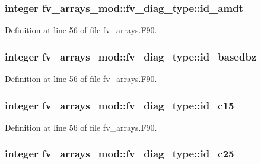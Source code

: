 \subsubsection[{id\-\_\-amdt}]{\setlength{\rightskip}{0pt plus 5cm}integer fv\-\_\-arrays\-\_\-mod\-::fv\-\_\-diag\-\_\-type\-::id\-\_\-amdt}\label{structfv__arrays__mod_1_1fv__diag__type_a06a291193449b74b2a54ea6a20c18d2d}


Definition at line 56 of file fv\-\_\-arrays.\-F90.

\subsubsection[{id\-\_\-basedbz}]{\setlength{\rightskip}{0pt plus 5cm}integer fv\-\_\-arrays\-\_\-mod\-::fv\-\_\-diag\-\_\-type\-::id\-\_\-basedbz}\label{structfv__arrays__mod_1_1fv__diag__type_acce987c8683af7c7152a73c1064a0a50}


Definition at line 56 of file fv\-\_\-arrays.\-F90.

\subsubsection[{id\-\_\-c15}]{\setlength{\rightskip}{0pt plus 5cm}integer fv\-\_\-arrays\-\_\-mod\-::fv\-\_\-diag\-\_\-type\-::id\-\_\-c15}\label{structfv__arrays__mod_1_1fv__diag__type_a25e7c161a39dffdb9bb4026c5c714358}


Definition at line 56 of file fv\-\_\-arrays.\-F90.

\subsubsection[{id\-\_\-c25}]{\setlength{\rightskip}{0pt plus 5cm}integer fv\-\_\-arrays\-\_\-mod\-::fv\-\_\-diag\-\_\-type\-::id\-\_\-c25}\label{structfv__arrays__mod_1_1fv__diag__type_aa1f3ec493e916301f4544cbed1bd1d31}


